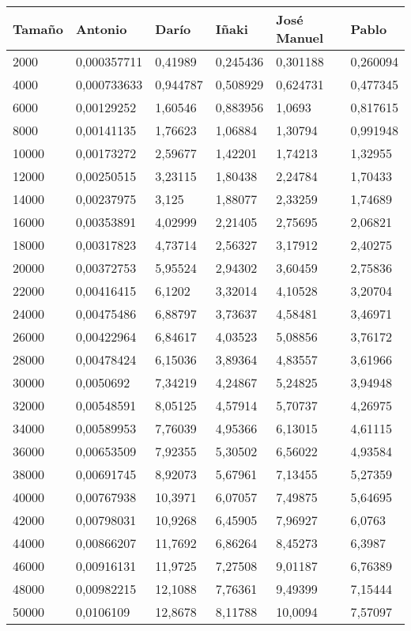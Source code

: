 \begin{tabular}{|l|l|l|l|l|l|}
	\hline
	Tamaño & Antonio & Darío & Iñaki & José Manuel & Pablo \\
	\hline
	\hline
	2000 & 0,000357711 & 0,41989 & 0,245436 & 0,301188 & 0,260094 \\
	\hline
	4000 & 0,000733633 & 0,944787 & 0,508929 & 0,624731 & 0,477345 \\
	\hline
	6000 & 0,00129252 & 1,60546 & 0,883956 & 1,0693 & 0,817615 \\
	\hline
	8000 & 0,00141135 & 1,76623 & 1,06884 & 1,30794 & 0,991948 \\
	\hline
	10000 & 0,00173272 & 2,59677 & 1,42201 & 1,74213 & 1,32955 \\
	\hline
	12000 & 0,00250515 & 3,23115 & 1,80438 & 2,24784 & 1,70433 \\
	\hline
	14000 & 0,00237975 & 3,125 & 1,88077 & 2,33259 & 1,74689 \\
	\hline
	16000 & 0,00353891 & 4,02999 & 2,21405 & 2,75695 & 2,06821 \\
	\hline
	18000 & 0,00317823 & 4,73714 & 2,56327 & 3,17912 & 2,40275 \\
	\hline
	20000 & 0,00372753 & 5,95524 & 2,94302 & 3,60459 & 2,75836 \\
	\hline
	22000 & 0,00416415 & 6,1202 & 3,32014 & 4,10528 & 3,20704 \\
	\hline
	24000 & 0,00475486 & 6,88797 & 3,73637 & 4,58481 & 3,46971 \\
	\hline
	26000 & 0,00422964 & 6,84617 & 4,03523 & 5,08856 & 3,76172 \\
	\hline
	28000 & 0,00478424 & 6,15036 & 3,89364 & 4,83557 & 3,61966 \\
	\hline
	30000 & 0,0050692 & 7,34219 & 4,24867 & 5,24825 & 3,94948 \\
	\hline
	32000 & 0,00548591 & 8,05125 & 4,57914 & 5,70737 & 4,26975 \\
	\hline
	34000 & 0,00589953 & 7,76039 & 4,95366 & 6,13015 & 4,61115 \\
	\hline
	36000 & 0,00653509 & 7,92355 & 5,30502 & 6,56022 & 4,93584 \\
	\hline
	38000 & 0,00691745 & 8,92073 & 5,67961 & 7,13455 & 5,27359 \\
	\hline
	40000 & 0,00767938 & 10,3971 & 6,07057 & 7,49875 & 5,64695 \\
	\hline
	42000 & 0,00798031 & 10,9268 & 6,45905 & 7,96927 & 6,0763 \\
	\hline
	44000 & 0,00866207 & 11,7692 & 6,86264 & 8,45273 & 6,3987 \\
	\hline
	46000 & 0,00916131 & 11,9725 & 7,27508 & 9,01187 & 6,76389 \\
	\hline
	48000 & 0,00982215 & 12,1088 & 7,76361 & 9,49399 & 7,15444 \\
	\hline
	50000 & 0,0106109 & 12,8678 & 8,11788 & 10,0094 & 7,57097 \\
	\hline
\end{tabular}
